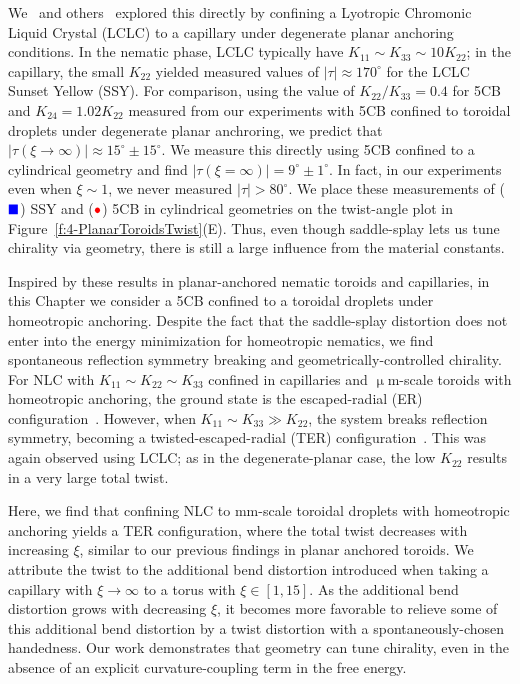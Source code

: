 We~\cite{RN293} and others~\cite{RN191} explored this directly by confining a Lyotropic Chromonic Liquid Crystal (LCLC) to a capillary under degenerate planar anchoring conditions.
In the nematic phase, LCLC typically have $K_{11} \sim K_{33} \sim 10 K_{22}$; in the capillary, the small $K_{22}$ yielded measured values of $|\tau| \approx 170 ^{\circ}$ for the LCLC Sunset Yellow (SSY).
For comparison, using the value of $K_{22}/K_{33}=0.4$ for 5CB and $K_{24} = 1.02 K_{22}$ measured from our experiments with 5CB confined to toroidal droplets under degenerate planar anchroring, we predict that $|\tau (\xi \rightarrow \infty)| \approx 15^{\circ} \pm 15^{\circ}$.
We measure this directly using 5CB confined to a cylindrical geometry and find $|\tau (\xi = \infty)| = 9^{\circ} \pm 1^{\circ}$.
In fact, in our experiments even when $\xi \sim 1$, we never measured $|\tau| > 80^{\circ}$.
We place these measurements of (${\color{blue} \blacksquare}$) SSY and (${\color{red} \bullet}$) 5CB in cylindrical geometries on the twist-angle plot in Figure~\ref{f:4-PlanarToroidsTwist}(E).
Thus, even though saddle-splay lets us tune chirality via geometry, there is still a large influence from the material constants.

Inspired by these results in planar-anchored nematic toroids and capillaries, in this Chapter we consider a 5CB confined to a toroidal droplets under homeotropic anchoring.
Despite the fact that the saddle-splay distortion does not enter into the energy minimization for homeotropic nematics, we find spontaneous reflection symmetry breaking and geometrically-controlled chirality.
For NLC with $K_{11}\sim K_{22} \sim K_{33}$ confined in capillaries and $\upmu$m-scale toroids with homeotropic anchoring, the ground state is the escaped-radial (ER) configuration~\cite{RN274}.
However, when $K_{11}\sim K_{33} \gg K_{22}$, the system breaks reflection symmetry, becoming a twisted-escaped-radial (TER) configuration~\cite{RN192}.
This was again observed using LCLC; as in the degenerate-planar case, the low $K_{22}$ results in a very large total twist.

Here, we find that confining NLC to mm-scale toroidal droplets with homeotropic anchoring yields a TER configuration, where the total twist decreases with increasing $\xi$, similar to our previous findings in planar anchored toroids.
We attribute the twist to the additional bend distortion introduced when taking a capillary with $\xi \rightarrow \infty$ to a torus with $\xi \in [1,15]$.
As the additional bend distortion grows with decreasing $\xi$, it becomes more favorable to relieve some of this additional bend distortion by a twist distortion with a spontaneously-chosen handedness.
Our work demonstrates that geometry can tune chirality, even in the absence of an explicit curvature-coupling term in the free energy.

